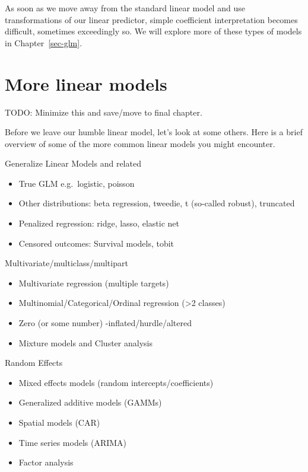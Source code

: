 \documentclass[
  letterpaper,
]{krantz}
\providecommand{\tightlist}{%
  \setlength{\itemsep}{0pt}\setlength{\parskip}{0pt}}\usepackage{longtable,booktabs,array}
\begin{document}
As soon as we move away from the standard linear model and use
transformations of our linear predictor, simple coefficient
interpretation becomes difficult, sometimes exceedingly so. We will
explore more of these types of models in Chapter~\ref{sec-glm}.

\section{More linear models}\label{sec-lm-more}

TODO: Minimize this and save/move to final chapter.

Before we leave our humble linear model, let's look at some others. Here
is a brief overview of some of the more common linear models you might
encounter.

Generalize Linear Models and related

\begin{itemize}
\tightlist
\item
  True GLM e.g.~logistic, poisson
\item
  Other distributions: beta regression, tweedie, t (so-called robust),
  truncated
\item
  Penalized regression: ridge, lasso, elastic net
\item
  Censored outcomes: Survival models, tobit
\end{itemize}

Multivariate/multiclass/multipart

\begin{itemize}
\tightlist
\item
  Multivariate regression (multiple targets)
\item
  Multinomial/Categorical/Ordinal regression (\textgreater2 classes)
\item
  Zero (or some number) -inflated/hurdle/altered
\item
  Mixture models and Cluster analysis
\end{itemize}

Random Effects

\begin{itemize}
\tightlist
\item
  Mixed effects models (random intercepts/coefficients)
\item
  Generalized additive models (GAMMs)
\item
  Spatial models (CAR)
\item
  Time series models (ARIMA)
\item
  Factor analysis
\end{itemize}
\end{document}
